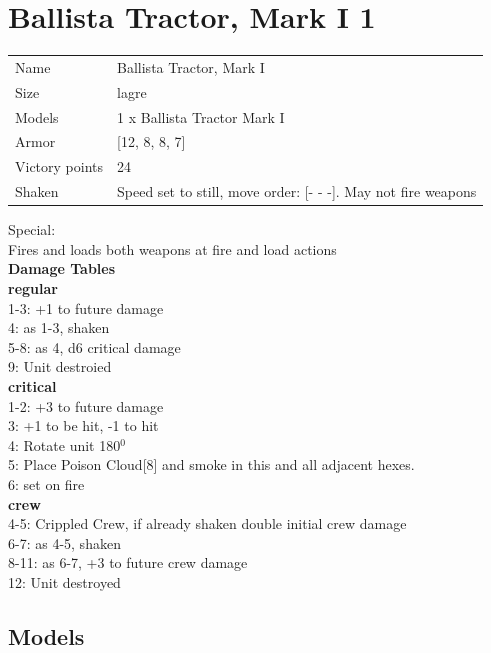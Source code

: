\clearpage

\section{ Ballista Tractor, Mark I 1 }

\begin{tabular}{ll}
  Name & Ballista Tractor, Mark I \\
  Size & lagre\\
  Models & 1 x Ballista Tractor Mark I\\
  Armor & [12, 8, 8, 7]\\
  Victory points & 24\\
  Shaken & Speed set to still, move order: [- - -]. May not fire weapons\\
\end{tabular}
Special: \\
Fires and loads both weapons at fire and load actions\\ 



{\bf Damage Tables} \\
 {\bf regular } \\
1-3: +1 to future damage \\
4: as 1-3, shaken \\
5-8: as 4, d6 critical damage \\
9: Unit destroied \\
 {\bf critical } \\
1-2: +3 to future damage \\
3: +1 to be hit, -1 to hit \\
4: Rotate unit 180$^0$ \\
5: Place Poison Cloud[8] and smoke in this and all adjacent hexes. \\
6: set on fire \\
 {\bf crew } \\
4-5: Crippled Crew, if already shaken double initial crew damage \\
6-7: as 4-5, shaken \\
8-11: as 6-7, +3 to future crew damage \\
12: Unit destroyed \\


\clearpage

\subsection{ Models }

